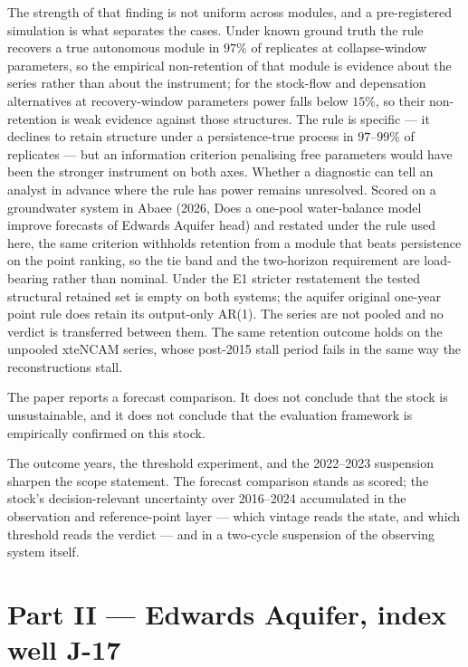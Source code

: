 \documentclass[11pt]{article}
\begin{document}
The strength of that finding is not uniform across modules, and a
pre-registered simulation is what separates the cases. Under known
ground truth the rule recovers a true autonomous module in \(97\%\) of
replicates at collapse-window parameters, so the empirical
non-retention of that module is evidence about the series rather than
about the instrument; for the stock-flow and depensation alternatives at
recovery-window parameters power falls below \(15\%\), so their
non-retention is weak evidence against those structures. The rule is
specific --- it declines to retain structure under a persistence-true
process in \(97\)--\(99\%\) of replicates --- but an information
criterion penalising free parameters would have been the stronger
instrument on both axes. Whether a diagnostic can tell an analyst in
advance where the rule has power remains unresolved. Scored on a
groundwater system in Abaee (2026, Does a one-pool water-balance model improve forecasts of Edwards Aquifer head) and restated under the rule used
here, the same criterion withholds retention from a module that beats
persistence on the point ranking, so the tie band and the two-horizon
requirement are load-bearing rather than nominal. Under the E1 stricter restatement the tested structural retained set
is empty on both systems; the aquifer original one-year point rule does
retain its output-only AR(1). The series are not pooled and no verdict is
transferred between them. The same retention outcome holds on the
unpooled xteNCAM series, whose post-2015 stall period fails in the same
way the reconstructions stall.

The paper reports a forecast comparison. It does not conclude that the
stock is unsustainable, and it does not conclude that the evaluation
framework is empirically confirmed on this stock.

The outcome years, the threshold experiment, and the 2022--2023
suspension sharpen the scope statement. The forecast comparison stands as
scored; the stock's decision-relevant uncertainty over 2016--2024
accumulated in the observation and reference-point layer --- which
vintage reads the state, and which threshold reads the verdict --- and in
a two-cycle suspension of the observing system itself.

\part*{Part II --- Edwards Aquifer, index well J-17}
\label{part:edwards}
\end{document}
